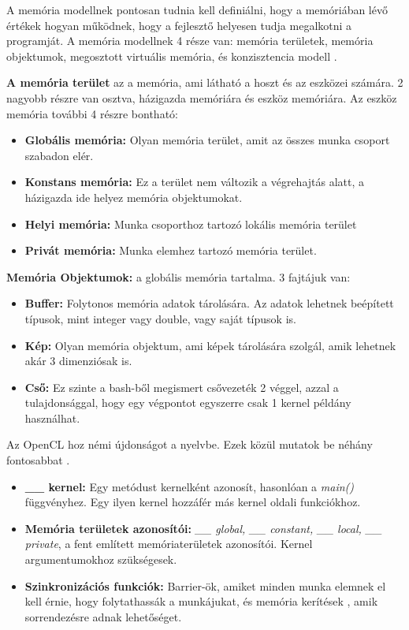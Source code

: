 A memória modellnek pontosan tudnia kell definiálni, hogy a memóriában lévő értékek hogyan működnek, hogy a fejlesztő helyesen tudja megalkotni a programját. A memória modellnek 4 része van: memória területek, memória objektumok, megosztott virtuális memória, és konzisztencia modell \cite{spec}.

\textbf{A memória terület} az a memória, ami látható a hoszt és az eszközei számára. 2 nagyobb részre van osztva, házigazda memóriára és eszköz memóriára. Az eszköz memória további 4 részre bontható:
\begin{itemize}
\item\textbf{Globális memória:} Olyan memória terület, amit az összes munka csoport szabadon elér.
\item\textbf{Konstans memória:} Ez a terület nem változik a végrehajtás alatt, a házigazda ide helyez memória objektumokat.
\item\textbf{Helyi memória:} Munka csoporthoz tartozó lokális memória terület
\item\textbf{Privát memória:} Munka elemhez tartozó memória terület.
\end{itemize}
\textbf{Memória Objektumok:} a globális memória tartalma. 3 fajtájuk van:
\begin{itemize}
\item\textbf{Buffer:} Folytonos memória adatok tárolására. Az adatok lehetnek beépített típusok, mint integer vagy double, vagy saját típusok is.
\item\textbf{Kép:} Olyan memória objektum, ami képek tárolására szolgál, amik lehetnek akár 3 dimenziósak is.
\item\textbf{Cső:} Ez szinte a bash-ből megismert csővezeték 2 véggel, azzal a tulajdonsággal, hogy egy végpontot egyszerre csak 1 kernel példány használhat.
\end{itemize}

Az OpenCL hoz némi újdonságot a nyelvbe. Ezek közül mutatok be néhány fontosabbat \cite{opencl_origin}.
\begin{itemize}
\item\textbf{\_\_ kernel:} Egy metódust kernelként azonosít, hasonlóan a \textit{main()} függvényhez. Egy ilyen kernel hozzáfér más kernel oldali funkciókhoz.
\item\textbf{Memória területek azonosítói:}\textit{ \_\_ global, \_\_ constant, \_\_ local, \_\_ private}, a fent említett memóriaterületek azonosítói. Kernel argumentumokhoz szükségesek.
\item\textbf{Szinkronizációs funkciók:} Barrier-ök, amiket minden munka elemnek el kell érnie, hogy folytathassák a munkájukat, és memória kerítések \cite{fence}, amik sorrendezésre adnak lehetőséget.
\end{itemize}

